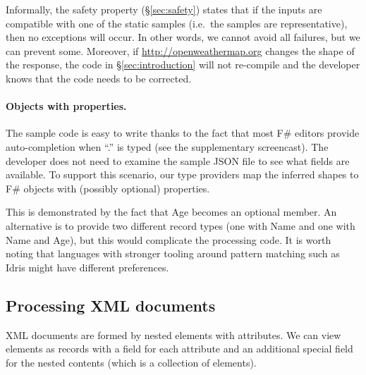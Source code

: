 \documentclass[10pt]{sigplanconf}
\newcommand{\ident}[1]{\textnormal{\sffamily #1}}
\begin{document}
Informally, the safety property (\S\ref{sec:safety}) states that if the inputs are compatible
with one of the static samples (i.e.~the samples are representative), then no exceptions will
occur. In other words, we cannot avoid all failures, but we can prevent some. Moreover, if
\url{http://openweathermap.org} changes the shape of the response, the code in \S\ref{sec:introduction}
will not re-compile and the developer knows that the code needs to be corrected.

\paragraph{Objects with properties.}
The sample code is easy to write thanks to the fact that most F\# editors provide auto-completion
when ``.'' is typed (see the supplementary screencast). The developer does not need to examine the
sample JSON file to see what fields are available. To support this scenario, our type providers
map the inferred shapes to F\# objects with (possibly optional) properties.

This is demonstrated by the fact that \ident{Age} becomes an optional member.
An alternative is to provide two different record types (one with \ident{Name} and one with
\ident{Name} and \ident{Age}), but this would complicate the processing code.
It is worth noting that languages with stronger tooling around pattern matching
such as Idris \cite{idris-tools} might have different preferences.


\subsection{Processing XML documents}
\label{sec:providers-xml}

XML documents are formed by nested elements with attributes. We can view elements as records with
a field for each attribute and an additional special field for the nested contents (which is a
collection of elements).
\end{document}
